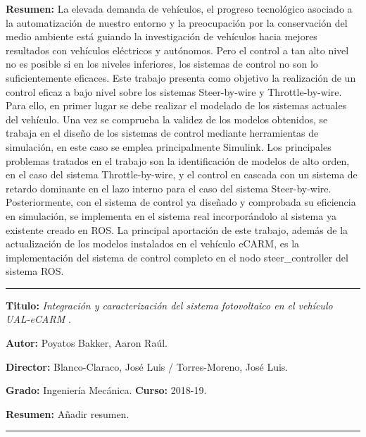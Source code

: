 \textbf{Resumen:} La elevada demanda de vehículos, el progreso tecnológico asociado a la automatización de nuestro entorno y la preocupación por la conservación del medio ambiente está guiando la investigación de vehículos hacia mejores resultados con vehículos eléctricos y autónomos. Pero el control a tan alto nivel no es posible si en los niveles inferiores, los sistemas de control no son lo suficientemente eficaces. Este trabajo presenta como objetivo la realización de un control eficaz a bajo nivel sobre los sistemas Steer-by-wire y Throttle-by-wire. Para ello, en primer lugar se debe realizar el modelado de los sistemas actuales del vehículo. Una vez se comprueba la validez de los modelos obtenidos, se trabaja en el diseño de los sistemas de control mediante herramientas de simulación, en este caso se emplea principalmente Simulink. Los principales problemas tratados en el trabajo son la identificación de modelos de alto orden, en el caso del sistema Throttle-by-wire, y el control en cascada con un sistema de retardo dominante en el lazo interno para el caso del sistema Steer-by-wire. Posteriormente, con el sistema de control ya diseñado y comprobada su eficiencia en simulación, se implementa en el sistema real incorporándolo al sistema ya existente creado en ROS. La principal aportación de este trabajo, además de la actualización de los modelos instalados en el vehículo eCARM, es la implementación del sistema de control completo en el nodo steer\_controller del sistema ROS.

\vspace{6pt} \hrule \vspace{6pt}
 
\textbf{Titulo:} \textit{Integración y caracterización del sistema fotovoltaico en el vehículo UAL-eCARM} \cite{poyatos2019UALeCARM}.

\textbf{Autor:} Poyatos Bakker, Aaron Raúl.

\textbf{Director:} Blanco-Claraco, José Luis / Torres-Moreno, José Luis.

\textbf{Grado:} Ingeniería Mecánica. \textbf{Curso:} 2018-19. 

 
\textbf{Resumen:} Añadir resumen.
 
\vspace{6pt} \hrule \vspace{6pt}
 
